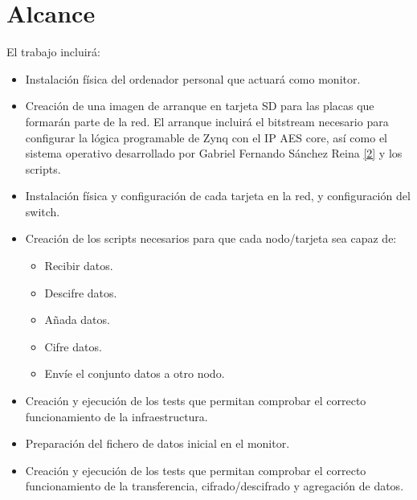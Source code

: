 \section{Alcance}
El trabajo incluirá:
\begin{itemize}
	\item Instalación física del ordenador personal que actuará como monitor.
	\item Creación de una imagen de arranque en tarjeta SD para las placas que formarán parte de la red. El arranque incluirá el bitstream necesario para configurar la lógica programable de Zynq con el IP AES core, así como el sistema operativo desarrollado por Gabriel Fernando Sánchez Reina \hyperlink{2}{[2]} y los scripts.
	\item Instalación física y configuración de cada tarjeta en la red, y configuración del switch.
	\item Creación de los scripts necesarios para que cada nodo/tarjeta sea capaz de:
	\begin{itemize}
		\item Recibir datos.
		\item Descifre datos.
		\item Añada datos.
		\item Cifre datos.
		\item Envíe el conjunto datos a otro nodo.
	\end{itemize}
	\item Creación y ejecución de los tests que permitan comprobar el correcto funcionamiento de la infraestructura.
	\item Preparación del fichero de datos inicial en el monitor.
	\item Creación y ejecución de los tests que permitan comprobar el correcto funcionamiento de la transferencia, cifrado/descifrado y agregación de datos.
\end{itemize}